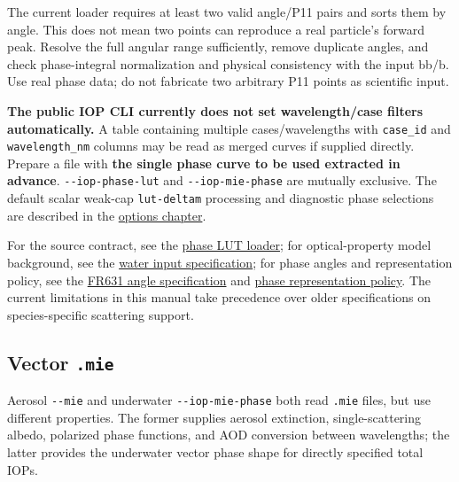 The current loader requires at least two valid angle/P11 pairs and sorts them by angle. This does not mean two points can reproduce a real particle's forward peak. Resolve the full angular range sufficiently, remove duplicate angles, and check phase-integral normalization and physical consistency with the input bb/b. Use real phase data; do not fabricate two arbitrary P11 points as scientific input.

\textbf{The public IOP CLI currently does not set wavelength/case filters automatically.} A table containing multiple cases/wavelengths with \texttt{case\_\allowbreak{}id} and \texttt{wavelength\_\allowbreak{}nm} columns may be read as merged curves if supplied directly. Prepare a file with \textbf{the single phase curve to be used extracted in advance}. \texttt{-\allowbreak{}-\allowbreak{}iop-\allowbreak{}phase-\allowbreak{}lut} and \texttt{-\allowbreak{}-\allowbreak{}iop-\allowbreak{}mie-\allowbreak{}phase} are mutually exclusive. The default scalar weak-cap \texttt{lut-\allowbreak{}deltam} processing and diagnostic phase selections are described in the \hyperref[chap:03_options]{options chapter}.

For the source contract, see the \href{https://github.com/brtnt/OCRT/blob/54861c68e35ec5aaa3938fad53e93dc2dfa7eb1d/code/OCRT_C/src/rt_water_rt.c\#L1469}{phase LUT loader}; for optical-property model background, see the \href{https://github.com/brtnt/OCRT/blob/54861c68e35ec5aaa3938fad53e93dc2dfa7eb1d/code/OCRT_C/docs/WATER_INPUT_INTERFACE_v1.19_2026-07-18.md}{water input specification}; for phase angles and representation policy, see the \href{https://github.com/brtnt/OCRT/blob/54861c68e35ec5aaa3938fad53e93dc2dfa7eb1d/code/OCRT_C/docs/PHASE_ANGLE_GRID_FR631_SPEC_KO.md}{FR631 angle specification} and \href{https://github.com/brtnt/OCRT/blob/54861c68e35ec5aaa3938fad53e93dc2dfa7eb1d/code/OCRT_C/docs/PHASE_REPRESENTATION_POLICY_KO.md}{phase representation policy}. The current limitations in this manual take precedence over older specifications on species-specific scattering support.

\subsection{Vector \texttt{.\allowbreak{}mie}}
\label{sec:auto:08_input_formats:4.2}
Aerosol \texttt{-\allowbreak{}-\allowbreak{}mie} and underwater \texttt{-\allowbreak{}-\allowbreak{}iop-\allowbreak{}mie-\allowbreak{}phase} both read \texttt{.\allowbreak{}mie} files, but use different properties. The former supplies aerosol extinction, single-scattering albedo, polarized phase functions, and AOD conversion between wavelengths; the latter provides the underwater vector phase shape for directly specified total IOPs.

